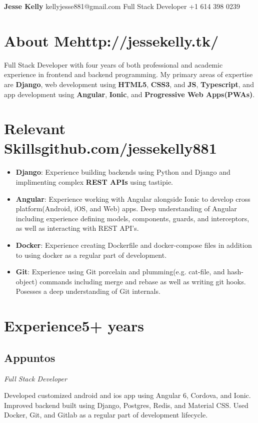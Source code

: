 \documentclass[letterpaper,11pt]{article}
\begin{document}
\begin{flushleft}
\Large{\textbf{Jesse Kelly}}
\hfill
kellyjesse881@gmail.com
\newline
Full Stack Developer
\hfill
+1 614 398 0239
\end{flushleft}

\section{About Me\hfill http://jessekelly.tk/}
Full Stack Developer with four years of both
professional and academic experience in frontend
and backend programming. My primary areas of
expertise are \textbf{Django}, web development using \textbf{HTML5},
\textbf{CSS3}, and \textbf{JS}, \textbf{Typescript}, and app development using
\textbf{Angular}, \textbf{Ionic}, and \textbf{Progressive Web Apps(PWAs)}.

\section{Relevant Skills\hfill github.com/jessekelly881}
\begin{itemize}
\item \textbf{Django}: Experience building backends using Python and Django and implimenting complex \textbf{REST APIs} using tastipie.
\item \textbf{Angular}: Experience working with Angular alongside Ionic to develop cross platform(Android, iOS, and Web) apps. Deep understanding of Angular including experience defining models, components, guards, and interceptors, as well as interacting with REST API's.
\item \textbf{Docker}: Experience creating Dockerfile and docker-compose files in addition to using docker as a regular part of development.
\item \textbf{Git}: Experience using Git porcelain and plumming(e.g. cat-file, and hash-object) commands including merge and rebase as well as writing git hooks. Posesses a deep understanding of Git internals.
\end{itemize}

\section{Experience\hfill 5+ years}
\subsection{Appuntos}
\textit{Full Stack Developer}
\vspace{2mm}
\begin{adjustwidth}{1cm}{1cm}
Developed customized android and ios
app using Angular 6, Cordova, and Ionic.
Improved backend built using Django,
Postgres, Redis, and Material CSS. Used
Docker, Git, and Gitlab as a regular part
of development lifecycle.
\end{adjustwidth}
\end{document}
